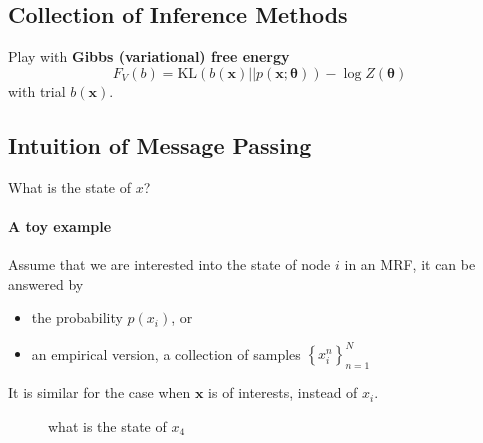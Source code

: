 \documentclass[xcolor=x11names,compress]{beamer}
\begin{document}
\subsection{Collection of Inference Methods}
{ 
  \begin{frame}
    \begin{center}
      {\large
        Play with
        \textbf{Gibbs (variational) free energy}
        \begin{equation*}
          F_V(b) = \mathrm{KL}(b( \bm{x}) || p(\bm{x}; \bm{\theta})) - \log{Z(\bm{\theta})}
        \end{equation*}
        with trial $b(\bm{x})$.
      }
    \end{center}
    
  \end{frame}
}


\subsection{Intuition of Message Passing}
\begin{frame}{What is the state of $x$?}
  \framesubtitle{A toy example}
  Assume that we are interested into the state of node $i$ in an MRF, it can be answered by
  \begin{itemize}[label={$\bullet$}]
  \item the probability $p(x_i)$, or
  \item an empirical version, a collection of samples $\left\{ x_i^n \right\}_{n=1}^{N}$
  \end{itemize}
  It is similar for the case when $\bm{x}$ is of interests, instead of $x_i$.
  \begin{figure}
    \captionsetup{labelformat=empty,justification=centering}
    \caption{what is the state of $x_4$}
    
  \end{figure}
  
\end{frame}
\end{document}
